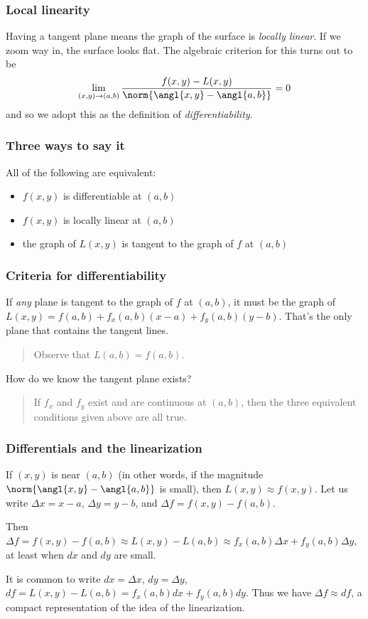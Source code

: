 \documentclass[11pt,ignorenonframetext,]{beamer}
\begin{document}
\begin{frame}\frametitle{Local linearity}

Having a tangent plane means the graph of the surface is \emph{locally
linear}. If we zoom way in, the surface looks flat. The algebraic
criterion for this turns out to be
\[ \lim_{(x, y) \to (a, b)} \frac{f(x, y) - L(x,y)}{\norm{\angl{x,y} - \angl{a,b}}} = 0\]
and so we adopt this as the definition of \emph{differentiability}.

\end{frame}

\begin{frame}\frametitle{Three ways to say it}

All of the following are equivalent:

\begin{itemize}[<+->]
\itemsep1pt\parskip0pt
\item
  $f(x,y)$ is differentiable at $(a,b)$
\item
  $f(x,y)$ is locally linear at $(a,b)$
\item
  the graph of $L(x,y)$ is tangent to the graph of $f$ at $(a,b)$
\end{itemize}

\end{frame}

\begin{frame}\frametitle{Criteria for differentiability}

If \emph{any} plane is tangent to the graph of $f$ at $(a,b)$, it must
be the graph of $L(x,y) = f(a,b) + f_x(a,b)(x-a) + f_y(a,b)(y - b)$.
That's the only plane that contains the tangent lines.

\begin{quote}
Observe that $L(a, b) = f(a, b)$.
\end{quote}

How do we know the tangent plane exists?

\begin{quote}
If $f_x$ and $f_y$ exist and are continuous at $(a,b)$, then the three
equivalent conditions given above are all true.
\end{quote}

\end{frame}

\begin{frame}\frametitle{Differentials and the linearization}

If $(x,y)$ is near $(a,b)$ (in other words, if the magnitude
$\norm{\angl{x,y} - \angl{a,b}}$ is small), then
$L(x,y) \approx f(x,y)$. Let us write $\Delta x = x - a$,
$\Delta y = y - b$, and $\Delta f = f(x,y) - f(a,b)$.

Then
$\Delta f = f(x,y) - f(a,b) \approx L(x,y) - L(a, b) \approx f_x(a,b)\Delta x + f_y(a,b) \Delta y$,
at least when $dx$ and $dy$ are small.

It is common to write $dx = \Delta x$, $dy = \Delta y$,
$df = L(x,y) - L(a,b) = f_x(a,b) dx + f_y(a,b) dy$. Thus we have
$\Delta f \approx df$, a compact representation of the idea of the
linearization.

\end{frame}
\end{document}
